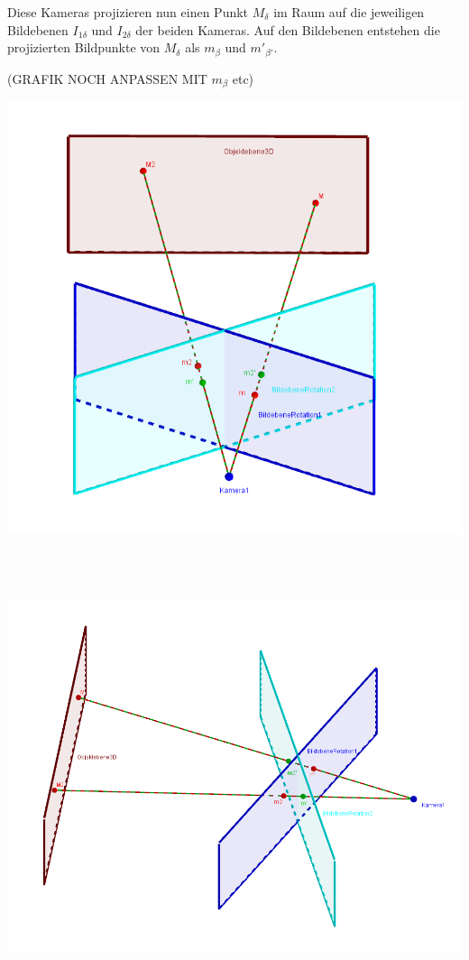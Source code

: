Diese Kameras projizieren nun einen Punkt $M_\delta$ im Raum auf die jeweiligen Bildebenen $I_{1\delta}$ und $I_{2\delta}$ der beiden Kameras. Auf den Bildebenen entstehen die projizierten Bildpunkte von $M_\delta$ als $m_\beta$ und $m'_{\beta'}$.

(GRAFIK NOCH ANPASSEN MIT $m_\beta$ etc)\\
\begin{minipage}{\linewidth}
	\centering
	\includegraphics[width=0.8\linewidth]{images/Homographie_rotation_1.png}
\end{minipage}\\ \\

\begin{minipage}{\linewidth}
	\centering
	\includegraphics[width=0.8\linewidth]{images/Homographie_rotation_2.png}
\end{minipage}\\ \\


